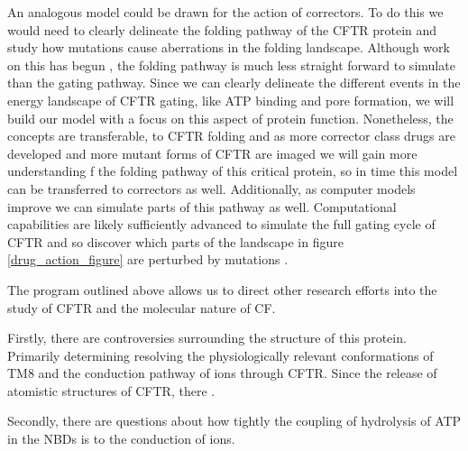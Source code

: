 An analogous model could be drawn for the action of correctors. To do this we would need to clearly delineate the folding pathway of the CFTR protein and study how mutations cause aberrations in the folding landscape. Although work on this has begun \cite{krainer2018, kleizen2021, kleizen2020, fiedorczuk2022, padanyi2022}, the folding pathway is much less straight forward to simulate than the gating pathway. Since we can clearly delineate the different events in the energy landscape of CFTR gating, like ATP binding and pore formation, we will build our model with a focus on this aspect of protein function. Nonetheless, the concepts are transferable, to CFTR folding and as more corrector class drugs are developed and more mutant forms of CFTR are imaged we will gain more understanding f the folding pathway of this critical protein, so in time this model can be transferred to correctors as well. Additionally, as computer models improve we can simulate parts of this pathway as well. Computational capabilities are likely sufficiently advanced to simulate the full gating cycle of CFTR and so discover which parts of the landscape in figure \ref{drug_action_figure} are perturbed by mutations \cite{}. 




The program outlined above allows us to direct other research efforts into the study of CFTR and the molecular nature of CF. 

Firstly, there are controversies surrounding the structure of this protein. Primarily determining resolving the physiologically relevant conformations of TM8 and the conduction pathway of ions through CFTR. Since the release of atomistic structures of CFTR, there .

Secondly, there are questions about how tightly the coupling of hydrolysis of ATP in the NBDs is to the conduction of ions.

